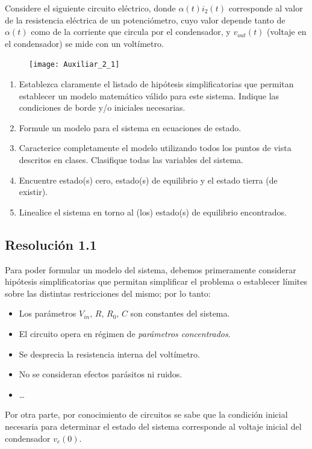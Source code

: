 \documentclass[
  11pt,
  letterpaper,
   addpoints,
   answers
  ]{exam}
\begin{document}
\begin{questions}
    \question Considere el siguiente circuito eléctrico, donde \(\alpha(t)i_2(t)\) corresponde al valor de la resistencia eléctrica de un potenciómetro, cuyo valor depende tanto de \(\alpha(t)\) como de la corriente que circula por el condensador, y \(v_{out}(t)\) (voltaje en el condensador) se mide con un voltímetro.
\begin{figure}[ht]
        \centering
        \texttt{[image: Auxiliar\_2\_1]}
    \end{figure}
\begin{enumerate}
    \item Establezca claramente el listado de hipótesis simplificatorias que permitan
    establecer un modelo matemático válido para este sistema. Indique las condiciones de borde y/o
    iniciales necesarias.
    \item Formule un modelo para el sistema en ecuaciones de estado.
    \item Caracterice completamente el modelo utilizando todos los puntos de vista descritos en clases.
    Clasifique todas las variables del sistema.
    \item Encuentre estado(s) cero, estado(s) de equilibrio y el estado tierra (de existir).
    \item Linealice el sistema en torno al (los) estado(s) de equilibrio encontrados.
\end{enumerate}
\begin{solution}
\subsection*{Resolución 1.1}
Para poder formular un modelo del sistema, debemos primeramente considerar hipótesis simplificatorias que permitan simplificar el problema o establecer límites sobre las distintas restricciones del mismo; por lo tanto:
\begin{itemize}
    \item Los parámetros \(V_{in},\,R,\,R_0,\,C\) son constantes del sistema.
    \item El circuito opera en régimen de \emph{parámetros concentrados}.
    \item Se desprecia la resistencia interna del voltímetro.
    \item No se consideran efectos parásitos ni ruidos.
    \item \dots
\end{itemize}
Por otra parte, por conocimiento de circuitos se sabe que la condición inicial necesaria para determinar el estado del sistema corresponde al voltaje inicial del condensador \(v_c(0)\).

\end{solution}
\end{questions}
\end{document}
